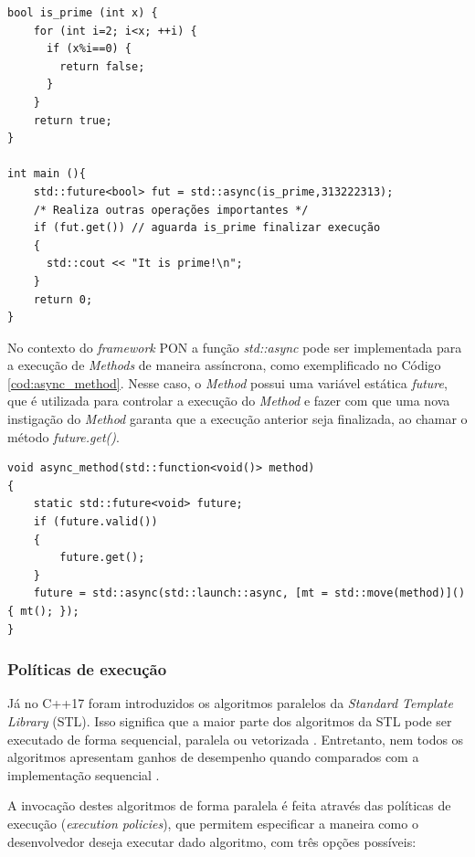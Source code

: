 \begin{lstlisting}[caption = {Uso de \textit{std::async}}, float=htb,
source = {Autoria própria},
label = {cod:async}]
bool is_prime (int x) {
    for (int i=2; i<x; ++i) {
      if (x%i==0) {
        return false;
      }
    }
    return true;
}

int main (){
    std::future<bool> fut = std::async(is_prime,313222313);
    /* Realiza outras operações importantes */
    if (fut.get()) // aguarda is_prime finalizar execução
    {
      std::cout << "It is prime!\n";
    }
    return 0;
}
\end{lstlisting}

No contexto do \textit{framework} PON a função \textit{std::async} pode ser
implementada para a execução de \textit{Methods} de maneira assíncrona, como
exemplificado no Código \ref{cod:async_method}. Nesse caso, o \textit{Method}
possui uma variável estática \textit{future}, que é utilizada para controlar a
execução do \textit{Method} e fazer com que uma nova instigação do
\textit{Method} garanta que a execução anterior seja finalizada, ao chamar o
método \textit{future.get()}.

\begin{lstlisting}[caption = {Execução de métodos assíncronos}, float=htb,
  source = {Autoria própria},
  label = {cod:async_method}]
void async_method(std::function<void()> method)
{
    static std::future<void> future;
    if (future.valid())
    {
        future.get();
    }
    future = std::async(std::launch::async, [mt = std::move(method)]() { mt(); });
}
\end{lstlisting}

\subsubsection{Políticas de execução}

Já no C++17 foram introduzidos os algoritmos paralelos da \textit{Standard
Template Library} (STL). Isso significa que a maior parte dos algoritmos da STL
pode ser executado de forma sequencial, paralela ou vetorizada
\cite{grimm_2017}. Entretanto, nem todos os algoritmos apresentam ganhos de
desempenho quando comparados com a implementação sequencial \cite{oneal_2018}.

A invocação destes algoritmos de forma paralela é feita através das políticas de
execução (\textit{execution policies}), que permitem especificar a maneira como
o desenvolvedor deseja executar dado algoritmo, com três opções possíveis:

